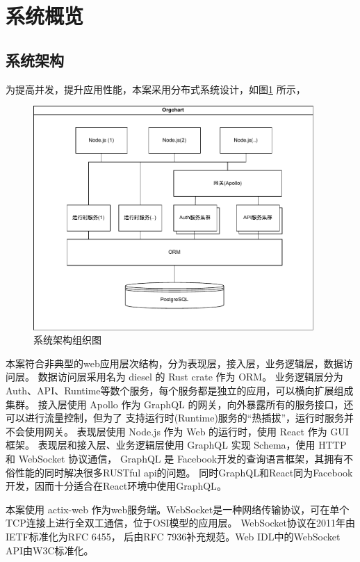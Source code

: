 \section{系统概览}
\subsection{系统架构}
为提高并发，提升应用性能，本案采用分布式系统设计，如图\ref{org} 所示，

\begin{figure}[htbp!]
    \centering
    \includegraphics[width=0.95\textwidth]{figures/pdf/org.pdf}
    \caption{\label{org}系统架构组织图}
\end{figure}

本案符合非典型的web应用层次结构，分为表现层，接入层，业务逻辑层，数据访问层。
数据访问层采用名为 diesel 的 Rust crate 作为 ORM。
业务逻辑层分为Auth、API、Runtime等数个服务，每个服务都是独立的应用，可以横向扩展组成集群。
接入层使用 Apollo 作为 GraphQL 的网关，向外暴露所有的服务接口，还可以进行流量控制，但为了
支持运行时(Runtime)服务的“热插拔”，运行时服务并不会使用网关。
表现层使用 Node.js 作为 Web 的运行时，使用 React 作为 GUI 框架。
表现层和接入层、业务逻辑层使用 GraphQL 实现 Schema，使用 HTTP 和 WebSocket 协议通信，
GraphQL 是 Facebook开发的查询语言框架，其拥有不俗性能的同时解决很多RUSTful api的问题。\cite{hartig2018semantics}
同时GraphQL和React同为Facebook开发，因而十分适合在React环境中使用GraphQL\cite{taelman2018graphql}。

本案使用 actix-web 作为web服务端。WebSocket是一种网络传输协议，可在单个TCP连接上进行全双工通信，位于OSI模型的应用层。
WebSocket协议在2011年由IETF标准化为RFC 6455\cite{fette2011websocket}，
后由RFC 7936补充规范。Web IDL中的WebSocket API由W3C标准化。

